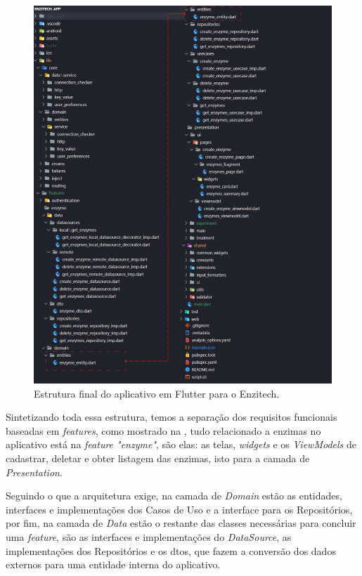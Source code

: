  \begin{figure}[H]
\centering
  \includegraphics[scale=0.29]{images/estrutura_app_final.pdf}
  \caption{Estrutura final do aplicativo em Flutter para o Enzitech.}
  \label{fig:estrutura_app_final}
\end{figure}

Sintetizando toda essa estrutura, temos a separação dos requisitos funcionais baseadas em \textit{features}, como mostrado na , tudo relacionado a enzimas no aplicativo está na \textit{feature "enzyme"}, são elas: as telas, \textit{widgets} e os \textit{ViewModels} de cadastrar, deletar e obter listagem das enzimas, isto para a camada de \textit{Presentation}.

Seguindo o que a arquitetura exige, na camada de \textit{Domain} estão as entidades, interfaces e implementações dos Casos de Uso e a interface para os Repositórios, por fim, na camada de \textit{Data} estão o restante das classes necessárias para concluir uma \textit{feature}, são as interfaces e implementações do \textit{DataSource}, as implementações dos Repositórios e os \acp{dto}, que fazem a conversão dos dados externos para uma entidade interna do aplicativo. 


